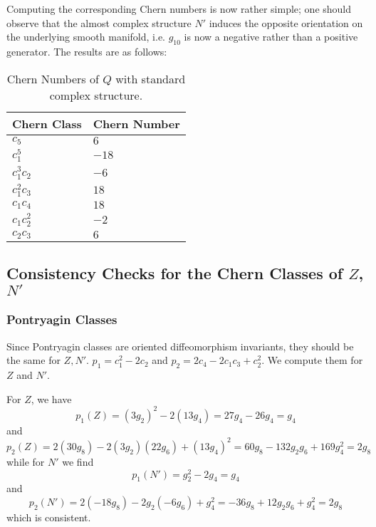 \documentclass{scrartcl}
\begin{document}
Computing the corresponding Chern numbers is now rather simple; one should observe that the almost complex structure $N'$ induces the opposite orientation on the underlying smooth manifold, i.e. $g_{10}$ is now a negative rather than a positive generator. The results are as follows:

\begin{table}[ht!]\centering
	\begin{tabular}{ll} \toprule
		Chern Class & Chern Number \\ \midrule
		$c_5$ 		& $6$ \\
		$c_1^5$ 	& $-18$ \\
		$c_1^3c_2$	& $-6$ \\
		$c_1^2c_3$	& $18$ \\
		$c_1c_4$	& $18$ \\
		$c_1c_2^2$	& $-2$ \\
		$c_2c_3$	& $6$ \\ \bottomrule
	\end{tabular}
	\caption{Chern Numbers of $Q$ with standard complex structure.}
\end{table}

\subsection{Consistency Checks for the Chern Classes of $Z$, $N'$}

\subsubsection{Pontryagin Classes}

Since Pontryagin classes are oriented diffeomorphism invariants, they should be the same for $Z,N'$. $p_1=c_1^2-2c_2$ and $p_2=2c_4-2c_1c_3+c_2^2$. We compute them for $Z$ and $N'$.

\medskip

For $Z$, we have 
\begin{equation*}
	p_1(Z)=(3g_2)^2-2(13g_4)=27g_4-26g_4=g_4
\end{equation*}
and 
\begin{equation*}
	p_2(Z)=2(30g_8)-2(3g_2)(22g_6)+(13g_4)^2=60g_8-132g_2g_6+169g_4^2=2g_8
\end{equation*}
while for $N'$ we find
\begin{equation*}
	p_1(N')=g_2^2-2g_4=g_4
\end{equation*}
and 
\begin{equation*}
	p_2(N')=2(-18g_8)-2g_2(-6g_6)+g_4^2=-36g_8+12g_2g_6+g_4^2=2g_8
\end{equation*}
which is consistent.
\end{document}

